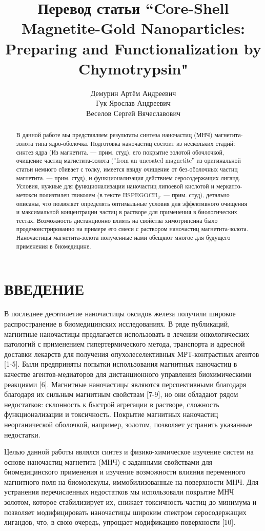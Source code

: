 \documentclass[10pt, a4paper]{article}
\title{Перевод статьи ``Core-Shell Magnetite-Gold Nanoparticles: Preparing and Functionalization by Chymotrypsin"}
\author{Демурин Артём Андреевич \\ Гук Ярослав Андреевич  \\ Веселов Сергей Вячеславович}
\date{}
\begin{document}
\maketitle

\begin{abstract}
В данной работе мы представляем результаты синтеза наночастиц (МНЧ) магнетита-
золота типа ядро-оболочка. Подготовка наночастиц состоит из нескольких стадий:
синтез ядра (Из магнетита. --- прим. студ), его покрытие золотой обочлочкой,
очищение частиц магнетита-золота (``from an uncoated magnetite'' из оригинальной
статьи немного сбивает с толку, имеется ввиду очищение от без-оболочных частиц
магнетита. --- прим. студ), и функционализация действием серосодержащих лиганд.
Условия, нужные для функционализации наночастиц липоевой кислотой и меркапто-метокси
полиэтилен гликолем (в тексте $\text{HSPEGOCH}_3$. --- прим. студ), детально описаны,
что позволяет определять оптимальные условия для эффективного очищения и 
максимальной концентрации частиц в растворе для применения в биологических 
тестах. Возможность дистанционно влиять на свойства химотрипсина было продемонстрированно
на примере его смеси с раствором наночастиц магнетита-золота. Наночастицы
магнетита-золота полученные нами обещяют многое для будущего применения 
в биомедицине.
\end{abstract}

\section*{ВВЕДЕНИЕ}
В последнее десятилетие наночастицы оксидов железа получили широкое распространение в биомедицинских исследованиях. В ряде публикаций,
магнитные наночастицы предлагается использовать в лечении онкологических патологий с применением гипертермического метода,
транспорта и адресной доставки лекарств для получения опухолеселективных МРТ-контрастных агентов [1-5]. Были предприняты попытки использования магнитных наночастиц
в качестве агентов-медиаторов для дистанционного управления биохимическими реакциями [6]. Магнитные наночастицы являются перспективными благодаря
благодаря их сильным магнитным свойствам [7-9], но они обладают рядом недостатков: склонность к быстрой агрегации в
растворе, сложность функционализации и токсичность. Покрытие магнитных наночастиц неорганической оболочкой, например, золотом,
позволяет устранить указанные недостатки.

Целью данной работы являлся синтез и физико-химическое изучение систем на основе наночастиц магнетита (МНЧ)
с заданными свойствами для биомедицинского применения и изучение возможности влияния переменного магнитного поля
на биомолекулы, иммобилизованные на поверхности МНЧ. Для устранения перечисленных недостатков мы использовали покрытие
МНЧ золотом, которое стабилизирует их, снижает токсичность частиц до минимума и позволяет модифицировать
наночастицы широким спектром серосодержащих лигандов, что, в свою очередь, упрощает модификацию поверхности [10].
\end{document}
